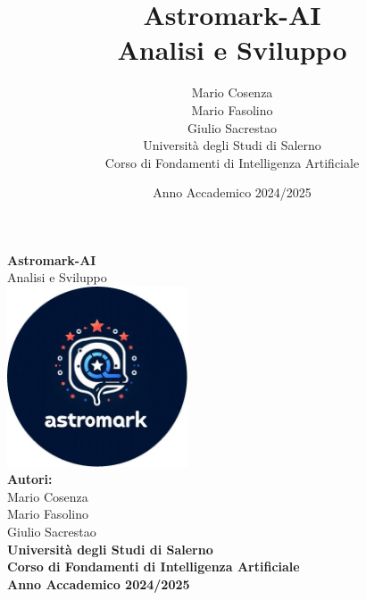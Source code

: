 \documentclass[a4paper,12pt]{report}
\title{\textbf{Astromark-AI}\\ \large Analisi e Sviluppo}
\author{Mario Cosenza \\ Mario Fasolino \\ Giulio Sacrestao \\ Università degli Studi di Salerno \\ Corso di Fondamenti di Intelligenza Artificiale}
\date{Anno Accademico 2024/2025}
\begin{document}
\begin{titlepage}
    \centering
    \vspace{2cm}
    \vfill
    {\Huge \textbf{Astromark-AI}}\\[1.5cm]
    {\Large Analisi e Sviluppo}\\[2cm]
    \includegraphics[width=0.4\textwidth]{images/astromarkLogo.jpg}\\[2cm]
    \textbf{Autori:}\\
    Mario Cosenza \\ Mario Fasolino \\ Giulio Sacrestao \\ \vspace{1cm}
    \textbf{Università degli Studi di Salerno}\\
    \textbf{Corso di Fondamenti di Intelligenza Artificiale}\\
    \vfill
    \textbf{Anno Accademico 2024/2025}
\end{titlepage}

\newpage

\pagestyle{fancy}
\fancyhf{}
\cfoot{\thepage}

\tableofcontents
\newpage








\appendix

\end{document}
